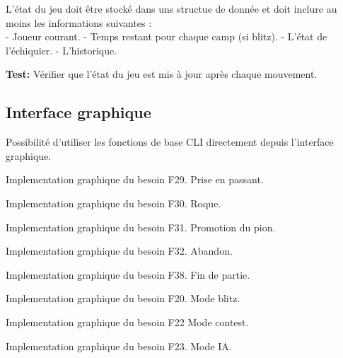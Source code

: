\documentclass{article}
\begin{document}
\begin{needbox}
    L’état du jeu doit être stocké dans uns structue de donnée et doit inclure au moins les informations suivantes : \\
    - Joueur courant.  
    - Temps restant pour chaque camp (si blitz).  
    - L’état de l’échiquier.  
    - L’historique.

    \textbf{Test:} Vérifier que l’état du jeu est mis à jour après chaque mouvement.
\end{needbox}

\subsection{Interface graphique}

\begin{needbox}
    Possibilité d'utiliser les fonctions de base CLI directement depuis l'interface graphique.
    \begin{subneedbox}
        Implementation graphique du besoin F29. Prise en passant.
    \end{subneedbox}
    \begin{subneedbox}[F46.2: Roque]
        Implementation graphique du besoin F30. Roque.
    \end{subneedbox}
    \begin{subneedbox}[F46.3: Promotion]
        Implementation graphique du besoin F31. Promotion du pion.
    \end{subneedbox}
    \begin{subneedbox}[F46.4: Abandon]
        Implementation graphique du besoin F32. Abandon.
    \end{subneedbox}
    \begin{subneedbox}
        Implementation graphique du besoin F38. Fin de partie.
    \end{subneedbox}
    \begin{subneedbox}
        Implementation graphique du besoin F20. Mode blitz.
    \end{subneedbox}
    \begin{subneedbox}
        Implementation graphique du besoin F22 Mode contest.
    \end{subneedbox}
    \begin{subneedbox}[F46.8: Mode IA]
        Implementation graphique du besoin F23. Mode IA.
    \end{subneedbox}
    
\end{needbox}
\end{document}
